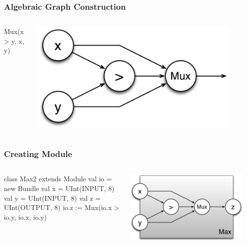 \documentclass[xcolor=pdflatex,dvipsnames,table]{beamer}
\begin{document}


\begin{frame}[fragile]
\frametitle{Algebraic Graph Construction}

\begin{columns}
{
\begin{scala}
Mux(x > y, x, y)
\end{scala}
}


\begin{center}
\includegraphics[width=0.9\textwidth]{figs/max2.pdf} 
\end{center}
\end{columns}
\end{frame}

\begin{frame}[fragile]
\frametitle{Creating Module}

\begin{columns}

{
\begin{scala}
class Max2 extends Module {
  val io = new Bundle {
    val x = UInt(INPUT, 8)
    val y = UInt(INPUT, 8)
    val z = UInt(OUTPUT, 8) }
  io.z := Mux(io.x > io.y, io.x, io.y)
}
\end{scala}
}

\begin{center}
\includegraphics[width=0.95\textwidth]{figs/Max2c.pdf} \\
\end{center}
\end{columns}

\end{frame}
\end{document}
